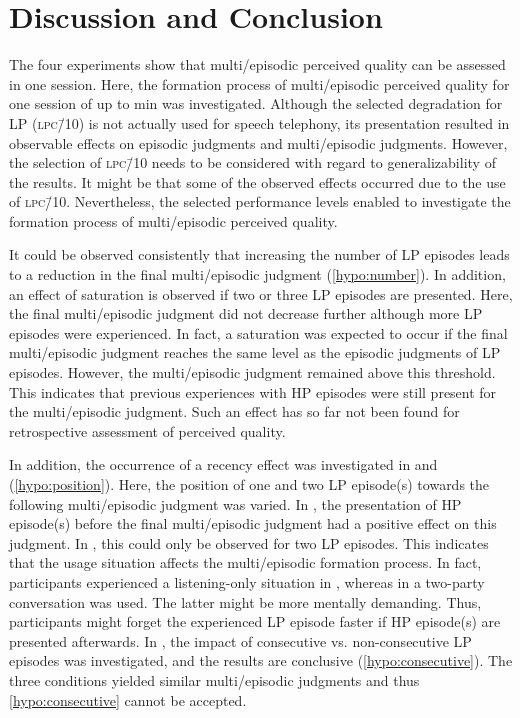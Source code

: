 \section{Discussion and Conclusion}
The four experiments show that multi\-/episodic perceived quality can be assessed in one session.
Here, the formation process of multi\-/episodic perceived quality for one session of up to \unit[45]{min} was investigated.
Although the selected degradation for \ac{LP} (\textsc{\lowercase{LPC\=/10}}) is not actually used for speech telephony, its presentation resulted in observable effects on episodic judgments and multi\-/episodic judgments.
However, the selection of \textsc{\lowercase{LPC\=/10}} needs to be considered with regard to generalizability of the results.
It might be that some of the observed effects occurred due to the use of \textsc{\lowercase{LPC\=/10}}.
Nevertheless, the selected performance levels enabled to investigate the formation process of multi\-/episodic perceived quality.

It could be observed consistently that increasing the number of \ac{LP} episodes leads to a reduction in the final multi\-/episodic judgment (\autoref{hypo:number}).
In addition, an effect of saturation is observed if two or three \ac{LP} episodes are presented.
Here, the final multi\-/episodic judgment did not decrease further although more \ac{LP} episodes were experienced.
In fact, a saturation was expected to occur if the final multi\-/episodic judgment reaches the same level as the episodic judgments of \ac{LP} episodes.
However, the multi\-/episodic judgment remained above this threshold.
This indicates that previous experiences with \ac{HP} episodes were still present for the multi\-/episodic judgment.
Such an effect has so far not been found for retrospective assessment of perceived quality.

In addition, the occurrence of a recency effect was investigated in  and \EIIa{} (\autoref{hypo:position}).
Here, the position of one and two \ac{LP} episode(s) towards the following multi\-/episodic judgment was varied.
In , the presentation of \ac{HP} episode(s) before the final multi\-/episodic judgment had a positive effect on this judgment.
In \EIIa{}, this could only be observed for two \ac{LP} episodes.
This indicates that the usage situation affects the multi\-/episodic formation process.
In fact, participants experienced a listening-only situation in \EIIa{}, whereas in  a two-party conversation was used.
The latter might be more mentally demanding.
Thus, participants might forget the experienced \ac{LP} episode faster if \ac{HP} episode(s) are presented afterwards.
In \EIIa{}, the impact of consecutive vs. non-consecutive \ac{LP} episodes was investigated, and the results are conclusive (\autoref{hypo:consecutive}).
The three conditions yielded similar multi\-/episodic judgments and thus \autoref{hypo:consecutive} cannot be accepted.

